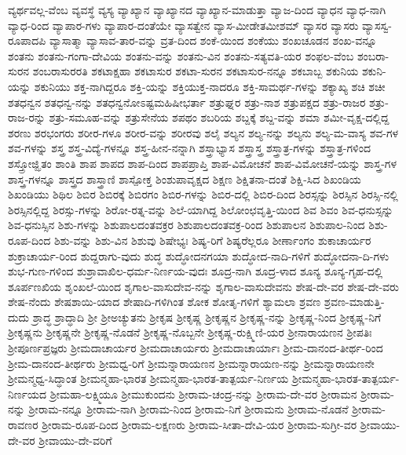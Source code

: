 ವ್ಯರ್ಥವಲ್ಲ-ವೆಂಬ
ವ್ಯವಸ್ಥೆ
ವ್ಯಸ್ಯ
ವ್ಯಾಖ್ಯಾನ
ವ್ಯಾಖ್ಯಾನದ
ವ್ಯಾಖ್ಯಾನ-ಮಾಡುತ್ತಾ
ವ್ಯಾಜ-ದಿಂದ
ವ್ಯಾಧನ
ವ್ಯಾಧ-ನಾಗಿ
ವ್ಯಾಧ-ರಿಂದ
ವ್ಯಾಪಾರ-ಗಳು
ವ್ಯಾಪಾರ-ದಂತೆಯೇ
ವ್ಯಾಸತ್ವೇನ
ವ್ಯಾಸ-ಮೀಡೇತಮೀಶಮ್
ವ್ಯಾಸರ
ವ್ಯಾಸರು
ವ್ಯಾಸಸ್ವ-ರೂಪಾದಪಿ
ವ್ಯಾಸಾತ್ಮಾ
ವ್ಯಾಸಾವ-ತಾರ-ವನ್ನು
ವ್ರತ-ದಿಂದ
ಶಂಕೆ-ಯಿಂದ
ಶಂಕೆಯು
ಶಂಖಚೂಡನ
ಶಂಖ-ವನ್ನೂ
ಶಂತನು
ಶಂತನು-ಗಂಗಾ-ದೇವಿಯ
ಶಂತನು-ವನ್ನು
ಶಂತನು-ವಿನ
ಶಂತನು-ಸತ್ಯವತಿ-ಯರ
ಶಂಫಲ-ವೆಂಬ
ಶಂಬರಾ-ಸುರನ
ಶಂಬರಾಸುರರತಿ
ಶಕಟಾಕ್ಷಹಾ
ಶಕಟಾಸುರ
ಶಕಟಾ-ಸುರನ
ಶಕಟಾಸುರ-ನನ್ನೂ
ಶಕಬಾಬ್ಬ
ಶಕುನಿಯ
ಶಕುನಿ-ಯನ್ನು
ಶಕುನಿಯು
ಶಕ್ತ-ನಾಗಿದ್ದರೂ
ಶಕ್ತಿ-ಯನ್ನು
ಶಕ್ತಿಯುಕ್ತ-ನಾದರೂ
ಶಕ್ತಿ-ಸಾಮರ್ಥ-ಗಳನ್ನು
ಶಕ್ಯಾಖ್ಯ
ಶಚಿ
ಶಚೀ
ಶತಧನ್ವನ
ಶತಧನ್ವ-ನನ್ನು
ಶತಧನ್ವನೋಽಷ್ಟಮಹಿಷೀಭರ್ತಾ
ಶತ್ರುಘ್ನರ
ಶತ್ರು-ನಾಶ
ಶತ್ರುಪಕ್ಷದ
ಶತ್ರು-ರಾಜರ
ಶತ್ರು-ರಾಜ-ರನ್ನು
ಶತ್ರು-ಸಮೂಹ-ವನ್ನು
ಶತ್ರುಸೇನೆಯ
ಶಪಥಂ
ಶಬರಿಯ
ಶಬ್ದಕ್ಕೆ
ಶಬ್ದ-ವನ್ನು
ಶಮಾ
ಶಮೀ-ವೃಕ್ಷ-ದಲ್ಲಿದ್ದ
ಶರಣು
ಶರಭಂಗರು
ಶರೀರ-ಗಳೂ
ಶರೀರ-ವನ್ನು
ಶರೀರವು
ಶಲೈ
ಶಲ್ಯನ
ಶಲ್ಯ-ನನ್ನು
ಶಲ್ಯನು
ಶಲ್ಯ-ಮ-ವಾಸ್ಯ
ಶವ-ಗಳ
ಶವ-ಗಳನ್ನು
ಶಸ್ತ್ರ
ಶಸ್ತ್ರ-ವಿದ್ಯೆ-ಗಳನ್ನೂ
ಶಸ್ತ್ರ-ಹೀನ-ನನ್ನಾಗಿ
ಶಸ್ತ್ರಾಭ್ಯಾಸ
ಶಸ್ತ್ರಾಸ್ತ್ರ
ಶಸ್ತ್ರಾತ್ರ-ಗಳನ್ನು
ಶಸ್ತ್ರಾತ್ರ-ಗಳಿಂದ
ಶಸ್ತ್ರೋಜ್ಝಿತಂ
ಶಾಂತಿ
ಶಾಪ
ಶಾಪದ
ಶಾಪ-ದಿಂದ
ಶಾಪಪ್ರಾಪ್ತಿ
ಶಾಪ-ವಿಮೋಚನೆ
ಶಾಪ-ವಿಮೋಚನೆ-ಯನ್ನು
ಶಾಸ್ತ್ರ-ಗಳ
ಶಾಸ್ತ್ರ-ಗಳನ್ನೂ
ಶಾಸ್ತ್ರದ
ಶಾಸ್ತ್ರಾಣಿ
ಶಾಸ್ಪೋಕ್ತ
ಶಿಂಶುಪಾವೃಕ್ಷದ
ಶಿಕ್ಷಣ
ಶಿಕ್ಷಿತನಾ-ದಂತೆ
ಶಿಕ್ಷಿ-ಸಿದ
ಶಿಖಂಡಿಯ
ಶಿಖಂಡಿಯು
ಶಿಥಿಲ
ಶಿಬಿರ
ಶಿಬಿರಕ್ಕೆ
ಶಿಬಿರಗಂ
ಶಿಬಿರ-ಗಳನ್ನು
ಶಿಬಿರ-ದಲ್ಲಿ
ಶಿಬಿರ-ದಿಂದ
ಶಿರಸ್ಸನ್ನು
ಶಿರಸ್ಸಿನ
ಶಿರಸ್ಸಿ-ನಲ್ಲಿ
ಶಿರಸ್ಸಿನಲ್ಲಿದ್ದ
ಶಿರಸ್ಸು-ಗಳನ್ನು
ಶಿರೋ-ರತ್ನ-ವನ್ನು
ಶಿಲೆ-ಯಾಗಿದ್ದ
ಶಿಲೋಂಛವೃತ್ತಿ-ಯಿಂದ
ಶಿವ
ಶಿವಂ
ಶಿವ-ಧನುಸ್ಸನ್ನು
ಶಿವ-ಧನುಸ್ಸಿನ
ಶಿಶು-ಗಳನ್ನು
ಶಿಶುಪಾಲದಂತವಕ್ರರ
ಶಿಶುಪಾಲದಂತವಕ್ರ-ರಿಂದ
ಶಿಶುಪಾಲನ
ಶಿಶುಪಾಲ-ನಿಂದ
ಶಿಶು-ರೂಪ-ದಿಂದ
ಶಿಶು-ವನ್ನು
ಶಿಶು-ವಿನ
ಶಿಶುವು
ಶಿಷೇಭ್ಯಃ
ಶಿಷ್ಯ-ರಿಗೆ
ಶಿಷ್ಯರೆಲ್ಲರೂ
ಶೀರ್ಣಾಂಗಂ
ಶುಕಾಚಾರ್ಯರ
ಶುಕ್ರಾಚಾರ್ಯ-ರಿಂದ
ಶುದ್ದರಾಗು-ವುದು
ಶುದ್ಧ
ಶುದ್ಧೋದನಗಯಾ
ಶುದ್ಧೋದ-ನಾದಿ-ಗಳಿಗೆ
ಶುದ್ಧೋದನಾ-ದಿ-ಗಳು
ಶುಭ-ಗುಣ-ಗಳಿಂದ
ಶುಶ್ರಾವಾಖಿಲ-ಧರ್ಮ-ನಿರ್ಣಯ-ವುದಃ
ಶೂದ್ರ-ನಾಗಿ
ಶೂದ್ರ-ಳಾದ
ಶೂನ್ಯ
ಶೂನ್ಯ-ಗೃಹ-ದಲ್ಲಿ
ಶೂರ್ಪಣಖಿಯ
ಶೃಂಖಲೆ-ಯಿಂದ
ಶೃಗಾಲ-ವಾಸುದೇವ-ನನ್ನು
ಶೃಗಾಲ-ವಾಸುದೇವನು
ಶೇಷ-ದೇ-ವರ
ಶೇಷ-ದೇ-ವರು
ಶೇಷ-ನೆಂದು
ಶೇಷಶಾಯಿ-ಯಾದ
ಶೇಷಾದಿ-ಗಳಿಗಿಂತ
ಶೋಕ
ಶೋತೃ-ಗಳಿಗೆ
ಶ್ಯಾಮಲಾ
ಶ್ರವಣ
ಶ್ರವಣ-ಮಾಡುತ್ತಿ-ದುದು
ಶ್ರಾದ್ಧ
ಶ್ರಾದ್ಧಾದಿ
ಶ್ರೀ
ಶ್ರೀಅಚ್ಯುತನು
ಶ್ರೀಕೃಷ
ಶ್ರೀಕೃಷ್ಣ
ಶ್ರೀಕೃಷ್ಣನ
ಶ್ರೀಕೃಷ್ಣ-ನನ್ನು
ಶ್ರೀಕೃಷ್ಣ-ನಿಂದ
ಶ್ರೀಕೃಷ್ಣ-ನಿಗೆ
ಶ್ರೀಕೃಷ್ಣನು
ಶ್ರೀಕೃಷ್ಣನೇ
ಶ್ರೀಕೃಷ್ಣ-ನೊಡನೆ
ಶ್ರೀಕೃಷ್ಣ-ನೊಬ್ಬನೇ
ಶ್ರೀಕೃಷ್ಣ-ರುಕ್ಷ್ಮಿಣಿ-ಯರ
ಶ್ರೀನಾರಾಯಣನ
ಶ್ರೀಪತಿಃ
ಶ್ರೀಪೂರ್ಣಪ್ರಜ್ಞರು
ಶ್ರೀಮದಾಚಾರ್ಯರ
ಶ್ರೀಮದಾಚಾರ್ಯರು
ಶ್ರೀಮದಾಚಾರ್ಯಾಃ
ಶ್ರೀಮ-ದಾನಂದ-ತೀರ್ಥ-ರಿಂದ
ಶ್ರೀಮ-ದಾನಂದ-ತೀರ್ಥರು
ಶ್ರೀಮಧ್ವ-ರಿಗೆ
ಶ್ರೀಮನ್ನಾರಾಯಣನ
ಶ್ರೀಮನ್ನಾರಾಯಣ-ನನ್ನು
ಶ್ರೀಮನ್ನಾರಾಯಣನೇ
ಶ್ರೀಮನ್ಮಧ್ವ-ಸಿದ್ಧಾಂತ
ಶ್ರೀಮನ್ಮಹಾ-ಭಾರತ
ಶ್ರೀಮನ್ಮಹಾ-ಭಾರತ-ತಾತ್ಪರ್ಯ-ನಿರ್ಣಯ
ಶ್ರೀಮನ್ಮಹಾ-ಭಾರತ-ತಾತ್ಪರ್ಯ-ನಿರ್ಣಯದ
ಶ್ರೀಮಹಾ-ಲಕ್ಷ್ಮಿಯೂ
ಶ್ರೀಮುಕುಂದನು
ಶ್ರೀರಾಮ-ಚಂದ್ರ-ನನ್ನು
ಶ್ರೀರಾಮ-ದೇ-ವರ
ಶ್ರೀರಾಮನ
ಶ್ರೀರಾಮ-ನನ್ನು
ಶ್ರೀರಾಮ-ನನ್ನೂ
ಶ್ರೀರಾಮ-ನಾಗಿ
ಶ್ರೀರಾಮ-ನಿಂದ
ಶ್ರೀರಾಮ-ನಿಗೆ
ಶ್ರೀರಾಮನು
ಶ್ರೀರಾಮ-ನೊಡನೆ
ಶ್ರೀರಾಮ-ರಾವಣರ
ಶ್ರೀರಾಮ-ರೂಪ-ದಿಂದ
ಶ್ರೀರಾಮ-ಲಕ್ಷಣರು
ಶ್ರೀರಾಮ-ಸೀತಾ-ದೇವಿ-ಯರ
ಶ್ರೀರಾಮ-ಸುಗ್ರೀ-ವರ
ಶ್ರೀವಾಯು-ದೇ-ವರ
ಶ್ರೀವಾಯು-ದೇ-ವರಿಗೆ
